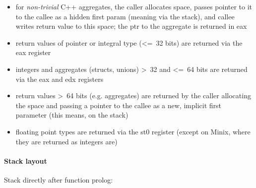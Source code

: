 \begin{itemize}
\item for {\it non-trivial} C++ aggregates, the caller allocates space, passes pointer to it to the callee as a hidden first param
(meaning via the stack), and callee writes return value to this space; the ptr to the aggregate is returned in eax
\item return values of pointer or integral type (\textless=\ 32 bits) are returned via the eax register
\item integers and aggregates (structs, unions) \textgreater\ 32 and \textless=\ 64 bits are returned via the eax and edx registers
\item return values \textgreater\ 64 bits (e.g. aggregates) are returned by the caller allocating the space and
passing a pointer to the callee as a new, implicit first parameter (this means, on the stack)
\item floating point types are returned via the st0 register (except on Minix, where they are returned as integers are)
\end{itemize}


\paragraph{Stack layout}

Stack directly after function prolog:\\


